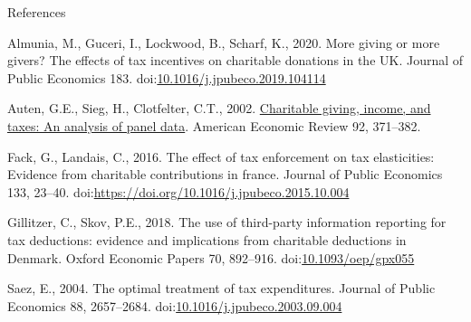 \documentclass[
  ignorenonframetext,
  aspectratio=169,
]{beamer}
\newlength{\cslhangindent}
\newlength{\cslentryspacingunit} %
\newenvironment{CSLReferences}[2] %
 {%
  \setlength{\parindent}{0pt}
  \ifodd #1
  \let\oldpar\par
  \def\par{\hangindent=\cslhangindent\oldpar}
  \fi
  \setlength{\parskip}{#2\cslentryspacingunit}
 }%
 {}
\begin{document}
\begin{frame}{References}
\hypertarget{refs}{}
\begin{CSLReferences}{1}{0}
\leavevmode{}%
Almunia, M., Guceri, I., Lockwood, B., Scharf, K., 2020. More giving or more givers? The effects of tax incentives on charitable donations in the UK. Journal of Public Economics 183. doi:\href{https://doi.org/10.1016/j.jpubeco.2019.104114}{10.1016/j.jpubeco.2019.104114}

\leavevmode{}%
Auten, G.E., Sieg, H., Clotfelter, C.T., 2002. \href{http://www.jstor.org/stable/3083340}{Charitable giving, income, and taxes: An analysis of panel data}. American Economic Review 92, 371--382.

\leavevmode{}%
Fack, G., Landais, C., 2016. The effect of tax enforcement on tax elasticities: Evidence from charitable contributions in france. Journal of Public Economics 133, 23--40. doi:\url{https://doi.org/10.1016/j.jpubeco.2015.10.004}

\leavevmode{}%
Gillitzer, C., Skov, P.E., 2018. {The use of third-party information reporting for tax deductions: evidence and implications from charitable deductions in Denmark}. Oxford Economic Papers 70, 892--916. doi:\href{https://doi.org/10.1093/oep/gpx055}{10.1093/oep/gpx055}

\leavevmode{}%
Saez, E., 2004. The optimal treatment of tax expenditures. Journal of Public Economics 88, 2657--2684. doi:\href{https://doi.org/10.1016/j.jpubeco.2003.09.004}{10.1016/j.jpubeco.2003.09.004}

\end{CSLReferences}
\end{frame}
\end{document}
